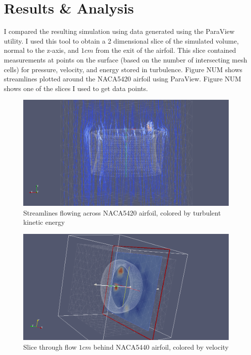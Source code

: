 \documentclass[12pt]{article}
\begin{document}
\section{Results \& Analysis}
I compared the resulting simulation using data generated using the ParaView 
utility.  I used this tool to obtain a 2 dimensional slice of the simulated
volume, normal to the z-axis, and $1cm$ from the exit of the airfoil.  This 
slice contained measurements at points on the surface (based on the number of 
intersecting mesh cells) for pressure, velocity, and energy stored in 
turbulence. Figure NUM shows streamlines plotted around the NACA5420 airfoil
using ParaView.  Figure NUM shows one of the slices I used to get data points.

\begin{figure}[H]
\centering
\includegraphics[width=6in]{../images/NACA5420_streamlines.png}
\caption{Streamlines flowing across NACA5420 airfoil, colored by turbulent
kinetic energy}
\end{figure}

\begin{figure}[H]
\centering
\includegraphics[width=6in]{../images/slice_generation.png}
\caption{Slice through flow $1cm$ behind NACA5440 airfoil, colored by velocity}
\end{figure}
\end{document}
